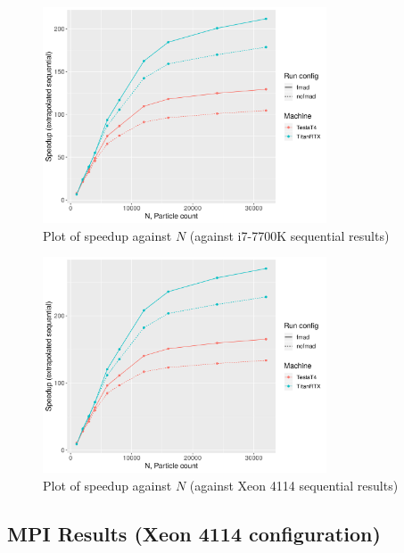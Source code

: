 \documentclass[12pt]{article}
\begin{document}
\begin{figure}[H]
    \centering
    \includegraphics[width=0.75\textwidth]{processedGpuResults/gpu-speedupI7.png}
    \caption{Plot of speedup against $N$ (against i7-7700K sequential results)}
    \label{fig:gpu-speedupI7}
\end{figure}

\begin{figure}[H]
    \centering
    \includegraphics[width=0.75\textwidth]{processedGpuResults/gpu-speedupXeS.png}
    \caption{Plot of speedup against $N$ (against Xeon 4114 sequential results)}
    \label{fig:gpu-speedupXeS}
\end{figure}

\subsection{MPI Results (Xeon 4114 configuration)}
\end{document}
